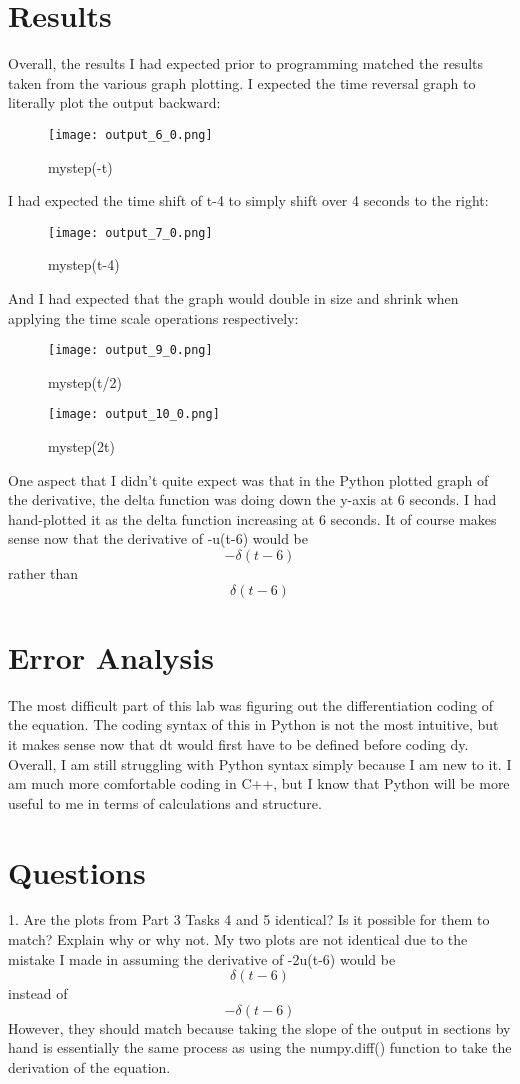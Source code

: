 \documentclass[12pt]{article}
\begin{document}
\section{Results}
Overall, the results I had expected prior to programming matched the results taken from the various graph plotting.
I expected the time reversal graph to literally plot the output backward:
\begin{figure}[H]
\centering
\texttt{[image: output\_6\_0.png]}
\caption{mystep(-t) \label{overflow}}
\end{figure}
I had expected the time shift of t-4 to simply shift over 4 seconds to the right:
\begin{figure}[H]
\centering
\texttt{[image: output\_7\_0.png]}
\caption{mystep(t-4) \label{overflow}}
\end{figure}
And I had expected that the graph would double in size and shrink when applying the time scale operations respectively:
\begin{figure}[H]
\centering
\texttt{[image: output\_9\_0.png]}
\caption{mystep(t/2) \label{overflow}}
\end{figure}
\begin{figure}[H]
\centering
\texttt{[image: output\_10\_0.png]}
\caption{mystep(2t) \label{overflow}}
\end{figure}
One aspect that I didn't quite expect was that in the Python plotted graph of the derivative, the delta function was doing down the y-axis at 6 seconds. I had hand-plotted it as the delta function increasing at 6 seconds. 
It of course makes sense now that the derivative of -u(t-6) would be \[-\delta(t-6)\] rather than \[\delta(t-6)\]
\section{Error Analysis}

The most difficult part of this lab was figuring out the differentiation coding of the equation. The coding syntax of this in Python is not the most intuitive, but it makes sense now that dt would first have to be defined before coding dy.
Overall, I am still struggling with Python syntax simply because I am new to it. I am much more comfortable coding in C++, but I know that Python will be more useful to me in terms of calculations and structure.
\section{Questions}
1. Are the plots from Part 3 Tasks 4 and 5 identical? Is it possible for them to match? Explain why or why not.
\newline
My two plots are not identical due to the mistake I made in assuming the derivative of -2u(t-6) would be \[\delta (t-6)\] instead of \[-\delta(t-6)\]
However, they should match because taking the slope of the output in sections by hand is essentially the same process as using the numpy.diff() function to take the derivation of the equation.
\end{document}
